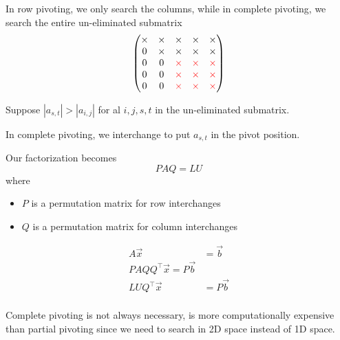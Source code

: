 In row pivoting, we only search the columns, while in complete pivoting, we search the entire un-eliminated submatrix \[
    \begin{pmatrix}
        \times & \times            & \times
               & \times            & \times            \\
        0      & \times            & \times
               & \times            & \times            \\
        0      & 0                 & \color{red}\times
               & \color{red}\times & \color{red}\times \\
        0      & 0                 & \color{red}\times
               & \color{red}\times & \color{red}\times \\
        0      & 0                 & \color{red}\times
               & \color{red}\times & \color{red}\times \\
    \end{pmatrix}
\]

Suppose \( | a_{s, t} | > | a_{i, j} | \) for al \( i, j, s, t \) in the un-eliminated submatrix.

In complete pivoting, we interchange to put \( a_{s, t} \) in the pivot position.

Our factorization becomes \[
    PAQ = LU
\] where
\begin{itemize}
    \item \( P \) is a permutation matrix for row interchanges
    \item \( Q \) is a permutation matrix for column interchanges
\end{itemize}
\begin{align*}
    A \vec{x}         & = \vec{b}  \\
    PA QQ^\top \vec{x} = P\vec{b}  \\
    LU Q^\top \vec{x} & = P\vec{b} \\
\end{align*}

\begin{remark}[Considerations]
    Complete pivoting is not always necessary, is more computationally expensive than partial pivoting since we need to search in 2D space instead of 1D space.
\end{remark}